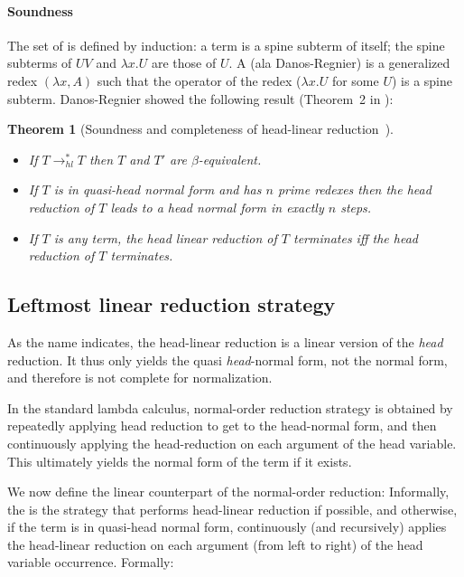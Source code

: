 \documentclass{elsarticle}
\theoremstyle{plain}
\newtheorem{theorem}{Theorem}[section]
\theoremstyle{definition}
\theoremstyle{remark}
\begin{document}
\paragraph{Soundness}
The set of  is defined by induction: a term is a spine subterm of itself; the spine subterms of $U V$ and $\lambda x. U$ are those of $U$.
A  (ala Danos-Regnier) is a generalized redex $(\lambda x, A)$ such that the operator of the redex ($\lambda x . U$ for some $U$) is a spine subterm. Danos-Regnier showed the following result (Theorem~2 in \cite{danos-head}):
\begin{theorem}[Soundness and completeness of head-linear reduction~\cite{danos-head}] \
\label{thm:danosreigner_headlinred}
\begin{itemize}[nosep]
\item If $T \rightarrow^*_{hl} T$  then $T$ and $T'$ are $\beta$-equivalent.
\item If $T$ is in quasi-head normal form and has $n$ prime redexes then the head reduction of $T$ leads to a head normal form in exactly $n$ steps.
\item If $T$ is any term, the head linear reduction of $T$ terminates iff the head reduction of $T$ terminates.
\end{itemize}
\end{theorem}

\subsection{Leftmost linear reduction strategy}

As the name indicates, the head-linear reduction is a linear version of the \emph{head} reduction. It thus only yields the quasi \emph{head}-normal form, not the normal form, and therefore is not complete for normalization.

In the standard lambda calculus, normal-order reduction strategy is obtained by repeatedly applying head reduction to get to the head-normal form, and then continuously applying the head-reduction on each argument of the head variable.
This ultimately yields the normal form of the term if it exists.

We now define the linear counterpart of the normal-order reduction: Informally, the  is the strategy that performs head-linear reduction if possible, and otherwise, if the term is in quasi-head normal form, continuously (and recursively) applies the head-linear reduction on each argument (from left to right) of the head variable occurrence.
Formally:
\end{document}
